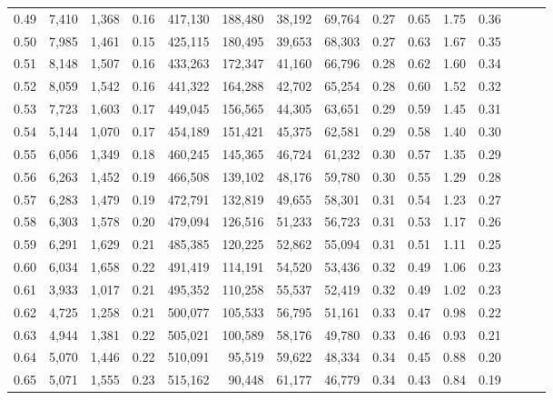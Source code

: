 \begin{tabular}{rrrrrrrrrrrrrrr}
0.49 &   7,410 &  1,368 &  0.16 &  417,130 &  188,480 &   38,192 &   69,764 &  0.27 &  0.65 &  1.75 &      0.36 \\
0.50 &   7,985 &  1,461 &  0.15 &  425,115 &  180,495 &   39,653 &   68,303 &  0.27 &  0.63 &  1.67 &      0.35 \\
0.51 &   8,148 &  1,507 &  0.16 &  433,263 &  172,347 &   41,160 &   66,796 &  0.28 &  0.62 &  1.60 &      0.34 \\
0.52 &   8,059 &  1,542 &  0.16 &  441,322 &  164,288 &   42,702 &   65,254 &  0.28 &  0.60 &  1.52 &      0.32 \\
0.53 &   7,723 &  1,603 &  0.17 &  449,045 &  156,565 &   44,305 &   63,651 &  0.29 &  0.59 &  1.45 &      0.31 \\
0.54 &   5,144 &  1,070 &  0.17 &  454,189 &  151,421 &   45,375 &   62,581 &  0.29 &  0.58 &  1.40 &      0.30 \\
0.55 &   6,056 &  1,349 &  0.18 &  460,245 &  145,365 &   46,724 &   61,232 &  0.30 &  0.57 &  1.35 &      0.29 \\
0.56 &   6,263 &  1,452 &  0.19 &  466,508 &  139,102 &   48,176 &   59,780 &  0.30 &  0.55 &  1.29 &      0.28 \\
0.57 &   6,283 &  1,479 &  0.19 &  472,791 &  132,819 &   49,655 &   58,301 &  0.31 &  0.54 &  1.23 &      0.27 \\
0.58 &   6,303 &  1,578 &  0.20 &  479,094 &  126,516 &   51,233 &   56,723 &  0.31 &  0.53 &  1.17 &      0.26 \\
0.59 &   6,291 &  1,629 &  0.21 &  485,385 &  120,225 &   52,862 &   55,094 &  0.31 &  0.51 &  1.11 &      0.25 \\
0.60 &   6,034 &  1,658 &  0.22 &  491,419 &  114,191 &   54,520 &   53,436 &  0.32 &  0.49 &  1.06 &      0.23 \\
0.61 &   3,933 &  1,017 &  0.21 &  495,352 &  110,258 &   55,537 &   52,419 &  0.32 &  0.49 &  1.02 &      0.23 \\
0.62 &   4,725 &  1,258 &  0.21 &  500,077 &  105,533 &   56,795 &   51,161 &  0.33 &  0.47 &  0.98 &      0.22 \\
0.63 &   4,944 &  1,381 &  0.22 &  505,021 &  100,589 &   58,176 &   49,780 &  0.33 &  0.46 &  0.93 &      0.21 \\
0.64 &   5,070 &  1,446 &  0.22 &  510,091 &   95,519 &   59,622 &   48,334 &  0.34 &  0.45 &  0.88 &      0.20 \\
0.65 &   5,071 &  1,555 &  0.23 &  515,162 &   90,448 &   61,177 &   46,779 &  0.34 &  0.43 &  0.84 &      0.19 \\

\end{tabular}
